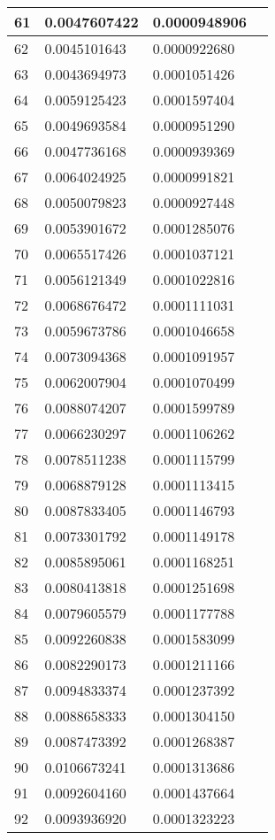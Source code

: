 \documentclass{article}
\begin{document}
\begin{table}[H]
{\begin{tabular}{|l|l|l|l|}
61 & 0.0047607422 & 0.0000948906 \\ \hline
62 & 0.0045101643 & 0.0000922680 \\ \hline
63 & 0.0043694973 & 0.0001051426 \\ \hline
64 & 0.0059125423 & 0.0001597404 \\ \hline
65 & 0.0049693584 & 0.0000951290 \\ \hline
66 & 0.0047736168 & 0.0000939369 \\ \hline
67 & 0.0064024925 & 0.0000991821 \\ \hline
68 & 0.0050079823 & 0.0000927448 \\ \hline
69 & 0.0053901672 & 0.0001285076 \\ \hline
70 & 0.0065517426 & 0.0001037121 \\ \hline
71 & 0.0056121349 & 0.0001022816 \\ \hline
72 & 0.0068676472 & 0.0001111031 \\ \hline
73 & 0.0059673786 & 0.0001046658 \\ \hline
74 & 0.0073094368 & 0.0001091957 \\ \hline
75 & 0.0062007904 & 0.0001070499 \\ \hline
76 & 0.0088074207 & 0.0001599789 \\ \hline
77 & 0.0066230297 & 0.0001106262 \\ \hline
78 & 0.0078511238 & 0.0001115799 \\ \hline
79 & 0.0068879128 & 0.0001113415 \\ \hline
80 & 0.0087833405 & 0.0001146793 \\ \hline
81 & 0.0073301792 & 0.0001149178 \\ \hline
82 & 0.0085895061 & 0.0001168251 \\ \hline
83 & 0.0080413818 & 0.0001251698 \\ \hline
84 & 0.0079605579 & 0.0001177788 \\ \hline
85 & 0.0092260838 & 0.0001583099 \\ \hline
86 & 0.0082290173 & 0.0001211166 \\ \hline
87 & 0.0094833374 & 0.0001237392 \\ \hline
88 & 0.0088658333 & 0.0001304150 \\ \hline
89 & 0.0087473392 & 0.0001268387 \\ \hline
90 & 0.0106673241 & 0.0001313686 \\ \hline
91 & 0.0092604160 & 0.0001437664 \\ \hline
92 & 0.0093936920 & 0.0001323223 \\ \hline

\end{tabular}}
\end{table}
\end{document}
